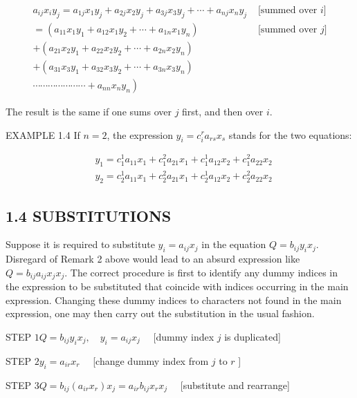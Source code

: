 \documentclass[10pt]{article}
\begin{document}
$$
\begin{array}{cc}
a_{i j} x_{i} y_{j}=a_{1 j} x_{1} y_{j}+a_{2 j} x_{2} y_{j}+a_{3 j} x_{3} y_{j}+\cdots+a_{n j} x_{n} y_{j} & \text { [summed over } i] \\
=\left(a_{11} x_{1} y_{1}+a_{12} x_{1} y_{2}+\cdots+a_{1 n} x_{1} y_{n}\right) & \text { [summed over } j] \\
+\left(a_{21} x_{2} y_{1}+a_{22} x_{2} y_{2}+\cdots+a_{2 n} x_{2} y_{n}\right) & \\
+\left(a_{31} x_{3} y_{1}+a_{32} x_{3} y_{2}+\cdots+a_{3 n} x_{3} y_{n}\right) & \\
\left.\cdots \cdots \cdots \cdots \cdots \cdots \cdots+a_{n n} x_{n} y_{n}\right) &
\end{array}
$$

The result is the same if one sums over $j$ first, and then over $i$.

EXAMPLE 1.4 If $n=2$, the expression $y_{i}=c_{i}^{r} a_{r s} x_{s}$ stands for the two equations:

$$
\begin{aligned}
& y_{1}=c_{1}^{1} a_{11} x_{1}+c_{1}^{2} a_{21} x_{1}+c_{1}^{1} a_{12} x_{2}+c_{1}^{2} a_{22} x_{2} \\
& y_{2}=c_{2}^{1} a_{11} x_{1}+c_{2}^{2} a_{21} x_{1}+c_{2}^{1} a_{12} x_{2}+c_{2}^{2} a_{22} x_{2}
\end{aligned}
$$

\subsection*{1.4 SUBSTITUTIONS}
Suppose it is required to substitute $y_{i}=a_{i j} x_{j}$ in the equation $Q=b_{i j} y_{i} x_{j}$. Disregard of Remark 2 above would lead to an absurd expression like $Q=b_{i j} a_{i j} x_{j} x_{j}$. The correct procedure is first to identify any dummy indices in the expression to be substituted that coincide with indices occurring in the main expression. Changing these dummy indices to characters not found in the main expression, one may then carry out the substitution in the usual fashion.

STEP $1 Q=b_{i j} y_{i} x_{j}, \quad y_{i}=a_{i j} x_{j} \quad$ [dummy index $j$ is duplicated]

STEP $2 y_{i}=a_{i r} x_{r} \quad$ [change dummy index from $j$ to $r$ ]

STEP $3 Q=b_{i j}\left(a_{i r} x_{r}\right) x_{j}=a_{i r} b_{i j} x_{r} x_{j} \quad$ [substitute and rearrange]
\end{document}
